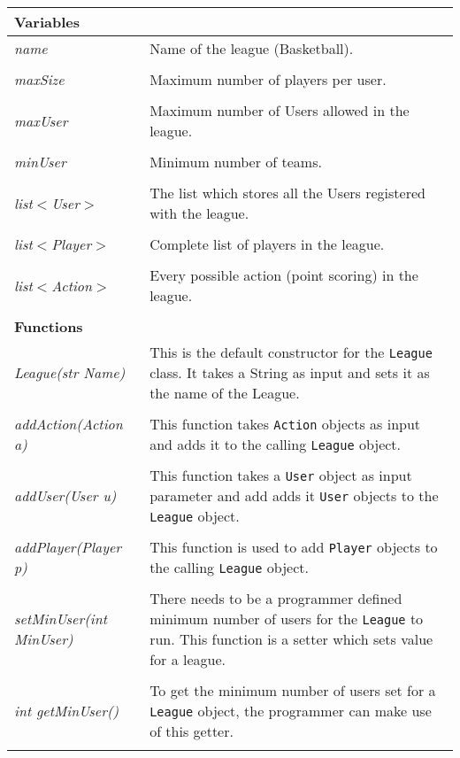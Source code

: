 \documentclass[12pt]{report}
\begin{document}
\begin{flushleft}
\begin{singlespace}
\begin{tabular}{ l | p{11cm} }
\hline
\textbf{Variables} & \\
\hline
\textit{name} & Name of the league (Basketball). \\
\\
\textit{maxSize} & Maximum number of players per user. \\
\\
\textit{maxUser} & Maximum number of Users allowed in the league. \\
\\
\textit{minUser} & Minimum number of teams. \\
\\
\textit{list$<$User$>$} & The list which stores all the Users registered with the league. \\
\\
\textit{list$<$Player$>$} & Complete list of players in the league. \\
\\
\textit{list$<$Action$>$} & Every possible action (point scoring) in the league. \\
\\
\hline
\textbf{Functions} & \\
\hline
\textit{League(str Name)} & This is the default constructor for the \texttt{League} class. It takes a String  as input and sets it as the name of the League. \\
\\
\textit{addAction(Action a)} & This function takes \texttt{Action} objects as input and adds it to the calling \texttt{League} object. \\	
\\
\textit{addUser(User u)} & This function takes a \texttt{User} object as input parameter and add adds it \texttt{User} objects to the \texttt{League} object. \\
\\
\textit{addPlayer(Player p)} & This function is used to add \texttt{Player} objects to the calling \texttt{League} object. \\
\\
\textit{setMinUser(int MinUser)} & There needs to be a programmer defined minimum number of users for the \texttt{League} to run. This function is a setter which sets value for a league. \\
\\
\textit{int getMinUser()} & To get the minimum number of users set for a \texttt{League} object, the programmer can make use of this getter. \\
\\
\end{tabular}
\end{singlespace}
\end{flushleft}
\end{document}
